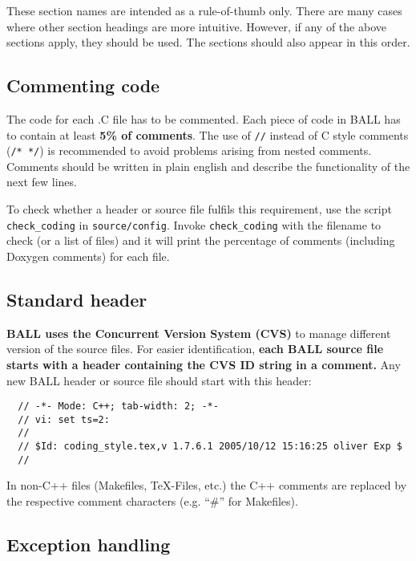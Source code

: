 \documentclass[a4paper,10pt]{article}
\begin{document}
These section names are intended as a rule-of-thumb only. There are many cases
where other section headings are more intuitive. However, if any of the above
sections apply, they should be used. The sections should also appear in this
order.

\subsection{Commenting code}

The code for each .C file has to be commented. Each piece of code in BALL has
to contain at least {\bf 5\% of comments}. The use of {\tt //} instead of C style
comments ({\tt /* */}) is recommended to avoid problems arising from nested
comments. Comments should be written in plain english and describe the
functionality of the next few lines.

To check whether a header or source file fulfils this requirement, use the
script {\tt check\_coding} in {\tt source/config}. Invoke {\tt check\_coding} with the
filename to check (or a list of files) and it will print the percentage of
comments (including Doxygen comments) for each file.

\subsection{Standard header}
                                                                                                                                                             
{\bf BALL uses the Concurrent Version System (CVS)} to manage different
version of the
source files. For easier identification, {\bf each BALL source file starts
with a header containing the CVS ID string in a comment.} Any new BALL header
or source file should start with this header:
\begin{verbatim}
  // -*- Mode: C++; tab-width: 2; -*-
  // vi: set ts=2:
  //
  // $Id: coding_style.tex,v 1.7.6.1 2005/10/12 15:16:25 oliver Exp $
  //                                                                                                                                                             
\end{verbatim}
In non-C++ files (Makefiles, TeX-Files, etc.) the C++ comments are replaced
by the respective comment characters (e.g. ``\#'' for Makefiles).

\subsection{Exception handling}
\end{document}
